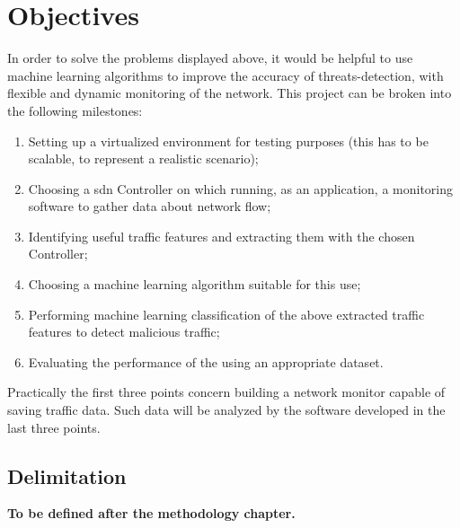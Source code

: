 
\section{Objectives}
\label{sec:objectives}

In order to solve the problems displayed above, it would be helpful to use machine learning algorithms to improve the accuracy of threats-detection, with flexible and dynamic monitoring of the network. This project can be broken into the following milestones:

\begin{enumerate}
    \item Setting up a virtualized environment for testing purposes (this has to be scalable, to represent a realistic scenario);
    \item Choosing a \gls{sdn} Controller on which running, as an application, a monitoring software to gather data about network flow;
    \item Identifying useful traffic features and extracting them with the chosen  Controller;
    \item Choosing a machine learning algorithm suitable for this use;
    \item Performing machine learning classification of the above extracted traffic features to detect malicious traffic;
    \item Evaluating the performance of the  using an appropriate dataset.
\end{enumerate}
Practically the first three points concern building a network monitor capable of saving traffic data. Such data will be analyzed by the software developed in the last three points.


\subsection{Delimitation}
\label{subsec:delimitation}

\faEdit \quad \textbf{To be defined after the methodology chapter.} \\

\textcolor{dimgray}{\lipsum[1-2]}


